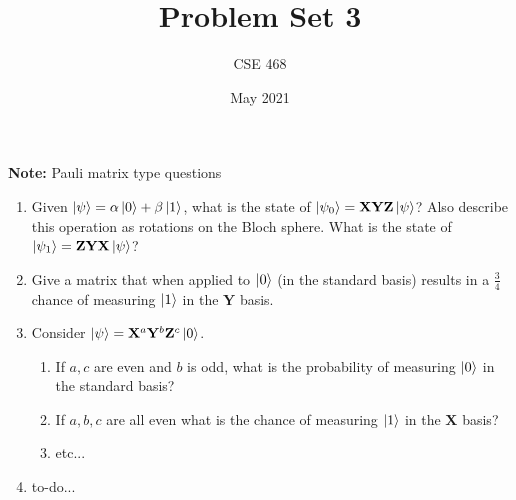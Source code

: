 \documentclass[12pt]{article}
\title{Problem Set 3}
\author{CSE 468}
\date{May 2021}
\begin{document}
\maketitle

\noindent \textbf{Note:} Pauli matrix type questions

\begin{enumerate}[font=\bfseries]
    \item Given $\ket{\psi} = \alpha\ket{0} + \beta\ket{1}$, what is the state of $\ket{\psi_0} = \mathbf{X}\mathbf{Y}\mathbf{Z}\ket{\psi}$? Also describe this operation as rotations on the Bloch sphere. What is the state of $\ket{\psi_1} = \mathbf{Z}\mathbf{Y}\mathbf{X}\ket{\psi}$?
    \item Give a matrix that when applied to $\ket{0}$ (in the standard basis) results in a $\frac{3}{4}$ chance of measuring $\ket{1}$ in the $\mathbf{Y}$ basis. 
    \item Consider $\ket{\psi} = \mathbf{X}^a\mathbf{Y}^b\mathbf{Z}^c\ket{0}$.
    \begin{enumerate}
        \item If $a,c$ are even and $b$ is odd, what is the probability of measuring $\ket{0}$ in the standard basis?
        \item If $a,b,c$ are all even what is the chance of measuring $\ket{1}$ in the $\mathbf{X}$ basis?
        \item etc...
    \end{enumerate}
    \item to-do...
\end{enumerate}
\end{document}
